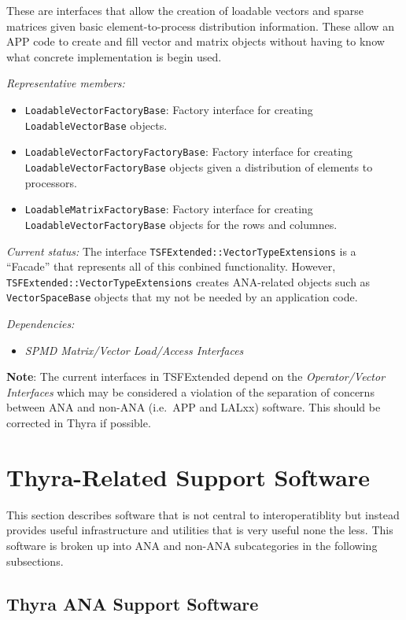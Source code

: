 \documentclass[pdf,ps2pdf,11pt]{SANDreport}
\begin{document}
These are interfaces that allow the creation of loadable vectors and sparse
matrices given basic element-to-process distribution information.  These allow
an APP code to create and fill vector and matrix objects without having to
know what concrete implementation is begin used.

{}\textit{Representative members:}
\begin{itemize}
%
{}\item {}\texttt{LoadableVectorFactoryBase}: Factory interface for creating
{}\texttt{LoadableVectorBase} objects.
%
{}\item {}\texttt{LoadableVectorFactoryFactoryBase}: Factory interface for
creating {}\texttt{LoadableVectorFactoryBase} objects given a distribution of
elements to processors.
%
{}\item {}\texttt{LoadableMatrixFactoryBase}: Factory interface for creating
{}\texttt{LoadableVectorFactoryBase} objects for the rows and columnes.
%
\end{itemize}

{}\textit{Current status:} The interface
{}\texttt{TSFExtended::VectorTypeExtensions} is a ``Facade'' that represents
all of this conbined functionality.  However,
{}\texttt{TSFExtended::VectorTypeExtensions} creates ANA-related objects such
as {}\texttt{VectorSpaceBase} objects that my not be needed by an application
code.

{}\textit{Dependencies:}
\begin{itemize}
\item {}\textit{SPMD Matrix/Vector Load/Access Interfaces}
\end{itemize}

{}\textbf{Note}: The current interfaces in TSFExtended depend on the
{}\textit{Operator/Vector Interfaces} which may be considered a violation
of the separation of concerns between ANA and non-ANA (i.e.\ APP and LALxx)
software.  This should be corrected in Thyra if possible.

%
\section{Thyra-Related Support Software}
%

This section describes software that is not central to interoperatiblity but
instead provides useful infrastructure and utilities that is very useful none
the less.  This software is broken up into ANA and non-ANA subcategories in
the following subsections.

%
\subsection{Thyra ANA Support Software}
%
\end{document}
